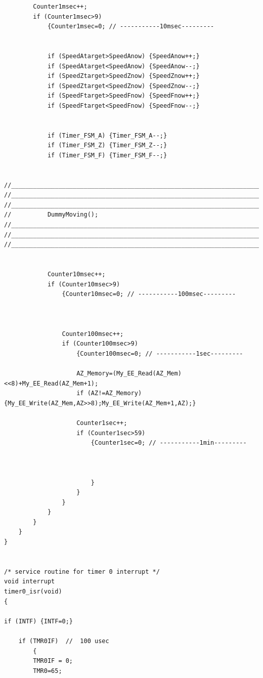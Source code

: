 \documentclass[
  a4paper,
  twoside,
  titlepage,
  11pt]{article}
\numberwithin{equation}{section}
\numberwithin{figure}{section}
\numberwithin{table}{section}
\begin{document}
\begin{verbatim}
        Counter1msec++;
        if (Counter1msec>9) 
            {Counter1msec=0; // -----------10msec---------      


            if (SpeedAtarget>SpeedAnow) {SpeedAnow++;}
            if (SpeedAtarget<SpeedAnow) {SpeedAnow--;}
            if (SpeedZtarget>SpeedZnow) {SpeedZnow++;}
            if (SpeedZtarget<SpeedZnow) {SpeedZnow--;}
            if (SpeedFtarget>SpeedFnow) {SpeedFnow++;}
            if (SpeedFtarget<SpeedFnow) {SpeedFnow--;}


            if (Timer_FSM_A) {Timer_FSM_A--;}
            if (Timer_FSM_Z) {Timer_FSM_Z--;}
            if (Timer_FSM_F) {Timer_FSM_F--;}


//_____________________________________________________________________________________________
//_____________________________________________________________________________________________
//_____________________________________________________________________________________________
//          DummyMoving();
//_____________________________________________________________________________________________
//_____________________________________________________________________________________________
//_____________________________________________________________________________________________


            Counter10msec++;
            if (Counter10msec>9) 
                {Counter10msec=0; // -----------100msec---------            
            


                Counter100msec++;
                if (Counter100msec>9) 
                    {Counter100msec=0; // -----------1sec---------

                    AZ_Memory=(My_EE_Read(AZ_Mem)<<8)+My_EE_Read(AZ_Mem+1);
                    if (AZ!=AZ_Memory) {My_EE_Write(AZ_Mem,AZ>>8);My_EE_Write(AZ_Mem+1,AZ);}    
    
                    Counter1sec++;
                    if (Counter1sec>59) 
                        {Counter1sec=0; // -----------1min---------
                            


                        }
                    }
                }
            }           
        }
    }
}


/* service routine for timer 0 interrupt */
void interrupt
timer0_isr(void)
{

if (INTF) {INTF=0;}

    if (TMR0IF)  //  100 usec
        {
        TMR0IF = 0;
        TMR0=65;


\end{verbatim}
\end{document}
